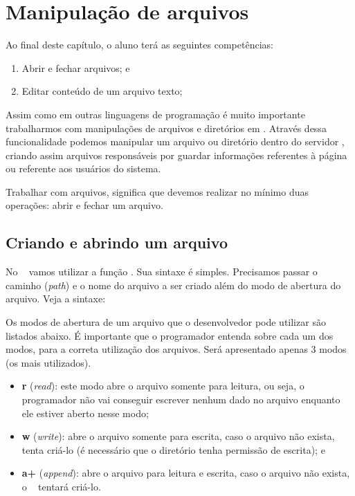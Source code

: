 \chapter{Manipulação de arquivos}
\label{manipulacao-de-arquivos}

Ao final deste capítulo, o aluno terá as seguintes competências:
\begin{enumerate}
    \item Abrir e fechar arquivos; e
    \item Editar conteúdo de um arquivo texto;
\end{enumerate}

Assim como em outras linguagens de programação é muito importante trabalharmos 
com manipulações de arquivos e diretórios em \php. Através dessa funcionalidade 
podemos manipular um arquivo ou diretório dentro do servidor \web, criando assim
arquivos responsáveis por guardar informações referentes à página ou referente
aos usuários do sistema. 

Trabalhar com arquivos, significa que devemos realizar no mínimo duas operações: 
abrir e fechar um arquivo.

\section{Criando e abrindo um arquivo}
\label{criando-e-abrindo-um-arquivo}

No \php~ vamos utilizar a função \funcaofopen. Sua sintaxe é simples. Precisamos
passar o caminho (\textit{path}) e o nome do arquivo a ser criado além do modo de
abertura do arquivo. Veja a sintaxe:



Os modos de abertura de um arquivo que o desenvolvedor pode utilizar são listados
abaixo. É importante que o programador entenda sobre cada um dos modos, para a 
correta utilização dos arquivos. Será apresentado apenas 3 modos (os mais utilizados).

\begin{itemize}
  \item \textbf{r} (\textit{read}): este modo abre o arquivo somente para leitura,
  ou seja, o programador não vai conseguir escrever nenhum dado no arquivo enquanto
  ele estiver aberto nesse modo;
  \item \textbf{w} (\textit{write}): abre o arquivo somente para escrita, caso o 
  arquivo não exista, tenta criá-lo (é necessário que o diretório tenha permissão
  de escrita); e
  \item \textbf{a+} (\textit{append}): abre o arquivo para leitura e escrita, 
  caso o arquivo não exista, o \php~ tentará criá-lo.  
\end{itemize}

